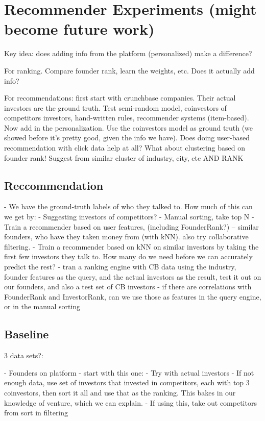 \chapter{Recommender Experiments (might become future work)}

Key idea: does adding info from the platform (personalized) make a difference?

For ranking. Compare founder rank, learn the weights, etc. Does it actually add info?

For recommendations: first start with crunchbase companies. Their actual investors are the ground truth. Test semi-random model, coinvestors of competitors investors, hand-written rules, recommender systems (item-based). Now add in the personalization. Use the coinvestors model as ground truth (we showed before it's pretty good, given the info we have). Does doing user-based recommendation with click data help at all? What about clustering based on founder rank! Suggest from similar cluster of industry, city, etc AND RANK


\section{Reccommendation}

- We have the ground-truth labels of who they talked to. How much of this can we get by:
  - Suggesting investors of competitors?
  - Manual sorting, take top N
  - Train a recommender based on user features, (including FounderRank?) -- similar founders, who have they taken money from (with kNN). also try collaborative filtering.
  - Train a recommender based on kNN on similar investors by taking the first few investors they talk to. How many do we need before we can accurately predict the rest?
  - tran a ranking engine with CB data using the industry, founder features as the query, and the actual investors as the result, test it out on our founders, and also a test set of CB investors
  - if there are correlations with FounderRank and InvestorRank, can we use those as features in the query engine, or in the manual sorting


\section{Baseline}

3 data sets?:

- Founders on platform - start with this one:
  - Try with actual investors
  - If not enough data, use set of investors that invested in competitors, each with top 3 coinvestors, then sort it all and use that as the ranking. This bakes in our knowledge of venture, which we can explain.
  - If using this, take out competitors from sort in filtering

